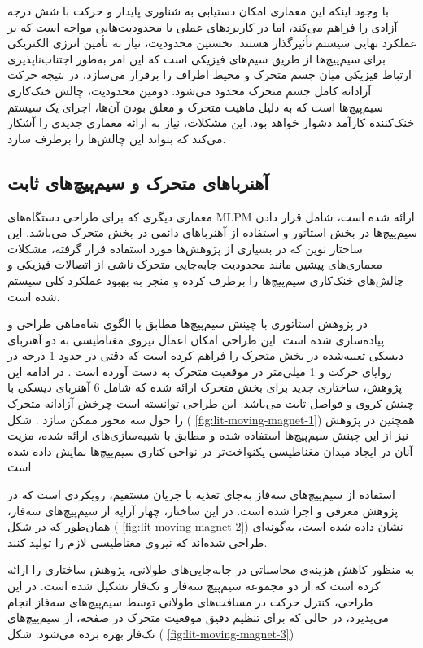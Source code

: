 با وجود اینکه این معماری امکان دستیابی به شناوری پایدار و حرکت با شش درجه آزادی را فراهم می‌کند، اما در کاربردهای عملی با محدودیت‌هایی مواجه است که بر عملکرد نهایی سیستم تأثیرگذار هستند. نخستین محدودیت، نیاز به تأمین انرژی الکتریکی برای سیم‌پیچ‌ها از طریق سیم‌های فیزیکی است که این امر به‌طور اجتناب‌ناپذیری ارتباط فیزیکی میان جسم متحرک و محیط اطراف را برقرار می‌سازد، در نتیجه حرکت آزادانه کامل جسم متحرک محدود می‌شود. دومین محدودیت، چالش خنک‌کاری سیم‌پیچ‌ها است که به دلیل ماهیت متحرک و معلق بودن آن‌ها، اجرای یک سیستم خنک‌کننده کارآمد دشوار خواهد بود. این مشکلات، نیاز به ارائه معماری جدیدی را آشکار می‌کند که بتواند این چالش‌ها را برطرف سازد.

\subsection{‌آهنرباهای متحرک و سیم‌پیچ‌های ثابت}
\label{subsec:lit-moving-magnet}

معماری دیگری که برای طراحی دستگاه‌های MLPM ارائه شده است، شامل قرار دادن سیم‌پیچ‌ها در بخش استاتور و استفاده از آهنرباهای دائمی در بخش متحرک می‌باشد. این ساختار نوین که در بسیاری از پژوهش‌ها مورد استفاده قرار گرفته، مشکلات معماری‌های پیشین مانند محدودیت جابه‌جایی متحرک ناشی از اتصالات فیزیکی و چالش‌های خنک‌کاری سیم‌پیچ‌ها را برطرف کرده و منجر به بهبود عملکرد کلی سیستم شده است.

در پژوهش 
\cite{RN7}
استاتوری با چینش سیم‌پیچ‌ها مطابق با الگوی شاه‌ماهی
طراحی و پیاده‌سازی شده است. این طراحی امکان اعمال نیروی مغناطیسی به دو آهنربای دیسکی تعبیه‌شده در بخش متحرک را فراهم کرده است که دقتی در حدود 1 درجه در زوایای حرکت و 1 میلی‌متر در موقعیت متحرک به دست آورده است
\cite{RN7}
. در ادامه این پژوهش، ساختاری جدید برای بخش متحرک ارائه شده که شامل 6 آهنربای دیسکی با چینش کروی و فواصل ثابت می‌باشد. این طراحی توانسته است چرخش آزادانه متحرک را حول سه محور ممکن سازد 
\cite{RN39}.
شکل (
\ref{fig:lit-moving-magnet-1})
همچنین در پژوهش 
\cite{RN62}
نیز از این چینش سیم‌پیچ‌ها استفاده شده و مطابق با شبیه‌سازی‌های ارائه شده، مزیت آنان در ایجاد میدان مغناطیسی یکنواخت‌تر در نواحی کناری سیم‌پیچ‌ها نمایش داده شده است.

استفاده از سیم‌پیچ‌های سه‌فاز به‌جای تغذیه با جریان مستقیم، رویکردی است که در پژوهش 
\cite{RN24}
معرفی و اجرا شده است. در این ساختار، چهار آرایه از سیم‌پیچ‌های سه‌فاز، همان‌طور که در 
شکل (
\ref{fig:lit-moving-magnet-2})
نشان داده شده است، به‌گونه‌ای طراحی شده‌اند که نیروی مغناطیسی لازم را تولید کنند.

به ‌منظور کاهش هزینه‌ی محاسباتی در جابه‌جایی‌های طولانی، پژوهش 
\cite{RN32}
ساختاری را ارائه کرده است که از دو مجموعه سیم‌پیچ‌ سه‌فاز و تک‌فاز تشکیل شده است. در این طراحی، کنترل حرکت در مسافت‌های طولانی توسط سیم‌پیچ‌های سه‌فاز انجام می‌پذیرد، در حالی که برای تنظیم دقیق موقعیت متحرک در صفحه، از سیم‌پیچ‌های تک‌فاز بهره برده می‌شود.
شکل (
\ref{fig:lit-moving-magnet-3})

